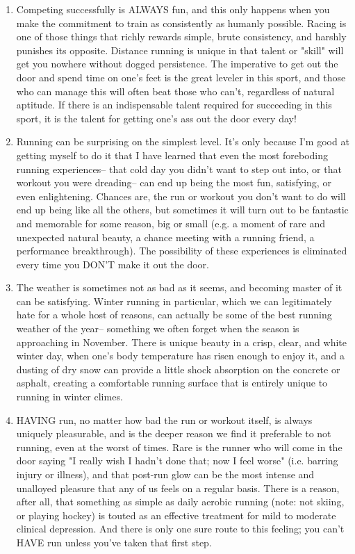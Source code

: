 \begin{enumerate}
    \item Competing successfully is ALWAYS fun, and this only happens when you make the commitment to train as consistently as humanly possible. Racing is one of those things that richly rewards simple, brute consistency, and harshly punishes its opposite. Distance running is unique in that talent or "skill" will get you nowhere without dogged persistence. The imperative to get out the door and spend time on one's feet is the great leveler in this sport, and those who can manage this will often beat those who can't, regardless of natural aptitude. If there is an indispensable talent required for succeeding in this sport, it is the talent for getting one's ass out the door every day!

    \item Running can be surprising on the simplest level. It's only because I'm good at getting myself to do it that I have learned that even the most foreboding running experiences-- that cold day you didn't want to step out into, or that workout you were dreading-- can end up being the most fun, satisfying, or even enlightening. Chances are, the run or workout you don't want to do will end up being like all the others, but sometimes it will turn out to be fantastic and memorable for some reason, big or small (e.g. a moment of rare and unexpected natural beauty, a chance meeting with a running friend, a performance breakthrough). The possibility of these experiences is eliminated every time you DON'T make it out the door.

    \item The weather is sometimes not as bad as it seems, and becoming master of it can be satisfying. Winter running in particular, which we can legitimately hate for a whole host of reasons, can actually be some of the best running weather of the year-- something we often forget when the season is approaching in November. There is unique beauty in a crisp, clear, and white winter day, when one's body temperature has risen enough to enjoy it, and a dusting of dry snow can provide a little shock absorption on the concrete or asphalt, creating a comfortable running surface that is entirely unique to running in winter climes.

    \item HAVING run, no matter how bad the run or workout itself, is always uniquely pleasurable, and is the deeper reason we find it preferable to not running, even at the worst of times. Rare is the runner who will come in the door saying "I really wish I hadn't done that; now I feel worse" (i.e. barring injury or illness), and that post-run glow can be the most intense and unalloyed pleasure that any of us feels on a regular basis. There is a reason, after all, that something as simple as daily aerobic running (note: not skiing, or playing hockey) is touted as an effective treatment for mild to moderate clinical depression. And there is only one sure route to this feeling; you can't HAVE run unless you've taken that first step.


\end{enumerate}
